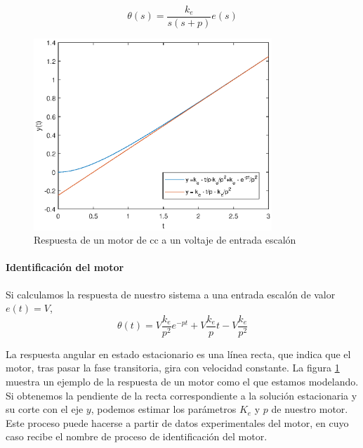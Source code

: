 \documentclass[10pt,a4paper]{report}
\begin{document}
\begin{equation}
\theta(s) = \frac{k_e}{s(s+p)}e(s)
\end{equation}

\begin{figure}
	\centering
	\includegraphics[width=0.8\textwidth]{resq.eps}
	\caption{Respuesta de un motor de cc a un voltaje de entrada escalón}\label{f22}
\end{figure}

\paragraph{Identificación del motor} Si calculamos la respuesta de nuestro sistema a una entrada escalón de valor $e(t) = V$,
\begin{equation}\label{eq314}
\theta(t) = V\frac{k_e}{p^2}e^{-pt}+V\frac{k_e}{p}t -V\frac{k_e}{p^2} 
\end{equation}



La respuesta angular en estado estacionario es una línea recta, que indica que el motor, tras pasar la fase transitoria, gira con velocidad constante. La figura \ref{f22} muestra un ejemplo de la respuesta de un motor como el que estamos modelando. Si obtenemos la pendiente de la recta correspondiente a la solución estacionaria y su corte con el eje $y$, podemos estimar los parámetros $K_e$ y $p$ de nuestro motor. Este proceso puede hacerse a partir de datos experimentales del motor, en cuyo caso recibe el nombre de proceso de identificación del motor.
\end{document}
